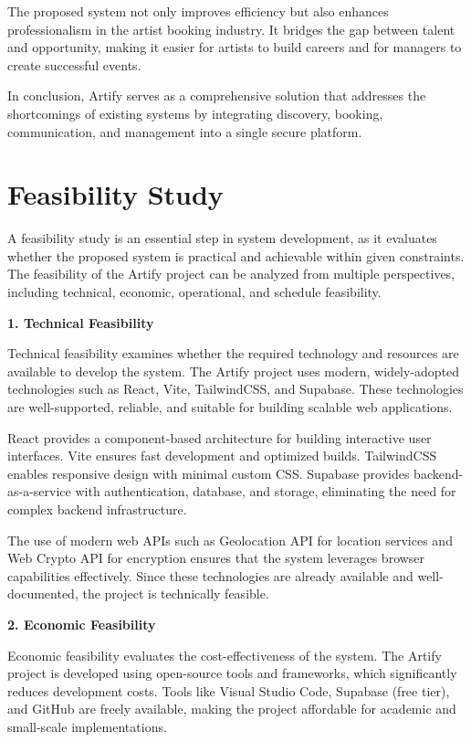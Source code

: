 \documentclass[12pt,a4paper]{report}
\begin{document}
The proposed system not only improves efficiency but also enhances professionalism in the artist booking industry. It bridges the gap between talent and opportunity, making it easier for artists to build careers and for managers to create successful events.

In conclusion, Artify serves as a comprehensive solution that addresses the shortcomings of existing systems by integrating discovery, booking, communication, and management into a single secure platform.

\section{Feasibility Study}
A feasibility study is an essential step in system development, as it evaluates whether the proposed system is practical and achievable within given constraints. The feasibility of the Artify project can be analyzed from multiple perspectives, including technical, economic, operational, and schedule feasibility.

\textbf{1. Technical Feasibility}

Technical feasibility examines whether the required technology and resources are available to develop the system. The Artify project uses modern, widely-adopted technologies such as React, Vite, TailwindCSS, and Supabase. These technologies are well-supported, reliable, and suitable for building scalable web applications.

React provides a component-based architecture for building interactive user interfaces. Vite ensures fast development and optimized builds. TailwindCSS enables responsive design with minimal custom CSS. Supabase provides backend-as-a-service with authentication, database, and storage, eliminating the need for complex backend infrastructure.

The use of modern web APIs such as Geolocation API for location services and Web Crypto API for encryption ensures that the system leverages browser capabilities effectively. Since these technologies are already available and well-documented, the project is technically feasible.

\textbf{2. Economic Feasibility}

Economic feasibility evaluates the cost-effectiveness of the system. The Artify project is developed using open-source tools and frameworks, which significantly reduces development costs. Tools like Visual Studio Code, Supabase (free tier), and GitHub are freely available, making the project affordable for academic and small-scale implementations.
\end{document}
